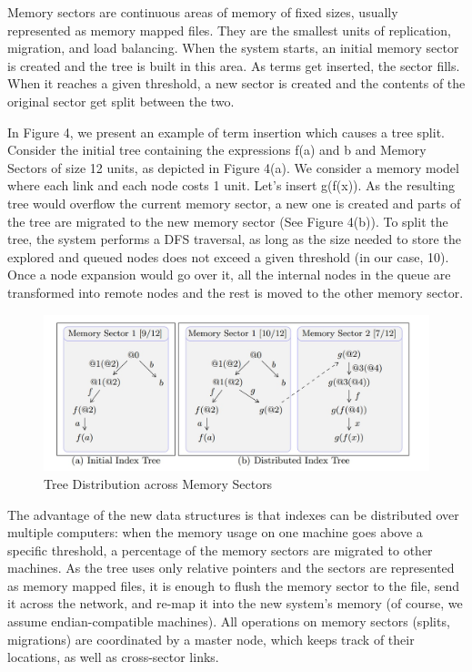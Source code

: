 \documentclass{deliverablereport}
\begin{document}
Memory sectors are continuous areas of memory of fixed sizes, usually represented as memory mapped files. They are the smallest units of replication, migration, and load balancing. When the system starts, an initial memory sector is created and the tree is built in this area. As terms get inserted, the sector fills. When it reaches a given threshold, a new sector is created and the contents of the original sector get split between the two. \par

In Figure 4, we present an example of term insertion which causes a tree split. Consider the initial tree containing the expressions f(a) and b and Memory Sectors of size 12 units, as depicted in Figure 4(a). We consider a memory model where each link and each node costs 1 unit. Let’s insert g(f(x)). As the resulting tree would overflow the current memory sector, a new one is created and parts of the tree are migrated to the new memory sector (See Figure 4(b)). To split the tree, the system performs a DFS traversal, as long as the size needed to store the explored and queued nodes does not exceed a given threshold (in our case, 10). Once a node expansion would go over it, all the internal nodes in the queue are transformed into remote nodes and the rest is moved to the other memory sector. \par

\begin{figure}[h]
\centering
 \includegraphics[scale=0.6]{figure4.jpg}
 \caption{Tree Distribution across Memory Sectors}
\end{figure}

The advantage of the new data structures is that indexes can be distributed over multiple computers: when the memory usage on one machine goes above a specific threshold, a percentage of the memory sectors are migrated to other machines. As the tree uses only relative pointers and the sectors are represented as memory mapped files, it is enough to flush the memory sector to the file, send it across the network, and re-map it into the new system’s memory (of course, we assume endian-compatible machines). All operations on memory sectors (splits, migrations) are coordinated by a master node, which keeps track of their locations, as well as cross-sector links. \par
\end{document}
